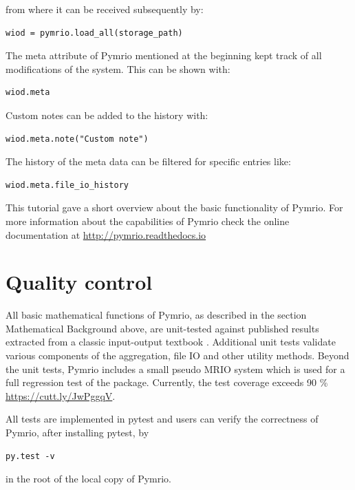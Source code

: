 \documentclass{jors}
\begin{document}
from where it can be received subsequently by:

\begin{lstlisting}
wiod = pymrio.load_all(storage_path)
\end{lstlisting}

The meta attribute of Pymrio mentioned at the beginning kept track of all modifications of the system.
This can be shown with:

\begin{lstlisting}
wiod.meta
\end{lstlisting}

Custom notes can be added to the history with:
\begin{lstlisting}
wiod.meta.note("Custom note")
\end{lstlisting}


The history of the meta data can be filtered for specific entries like:

\begin{lstlisting}
wiod.meta.file_io_history
\end{lstlisting}


This tutorial gave a short overview about the basic functionality of Pymrio. 
For more information about the capabilities of Pymrio check the online documentation at 
\url{http://pymrio.readthedocs.io} 
\cite{stadler2018_pymrio}



\section*{Quality control}

All basic mathematical functions of Pymrio, as described in the section Mathematical Background above, are unit-tested against published results extracted from a classic input-output textbook \cite{miller2009_Inputoutput}.
Additional unit tests validate various components of the aggregation, file IO and other utility methods.
Beyond the unit tests, Pymrio includes a small pseudo MRIO system which is used for a full regression test of the package. Currently, the test coverage exceeds 90 \% \url{https://cutt.ly/JwPggqV}. 

All tests are implemented in pytest and users can verify the correctness of Pymrio, after installing pytest, by

\begin{lstlisting}
py.test -v
\end{lstlisting}

in the root of the local copy of Pymrio.
\end{document}
